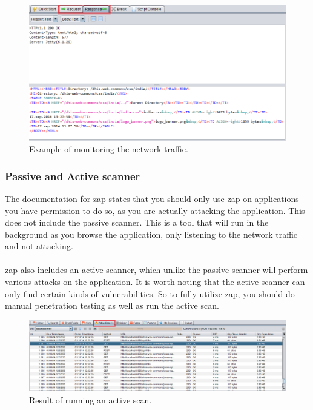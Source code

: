 \documentclass[11pt,english,a4paper]{report}
\begin{document}
\begin{figure}[h]
    \centering
    \includegraphics[scale=0.45]{images/zap-right-menu.png}
    \caption{Example of monitoring the network traffic. }
    \label{fig:zaprightmenu}
\end{figure}

\subsubsection{Passive and Active scanner}
The documentation for \gls{zap} states that you should only use \gls{zap} on applications you have permission to do so, as you are actually attacking the application. 
This does not include the passive scanner. 
This is a tool that will run in the background as you browse the application, only listening to the network traffic and not attacking.

\paragraph{}
\gls{zap} also includes an active scanner, which unlike the passive scanner will perform various attacks on the application. 
It is worth noting that the active scanner can only find certain kinds of vulnerabilities. 
So to fully utilize \gls{zap}, you should do manual penetration testing as well as run the active scan.

\begin{figure}[h]
    \centering
    \includegraphics[scale=0.35]{images/zap-active-scan.png}
    \caption{Result of running an active scan. }
    \label{fig:zapactivescan}
\end{figure}
\end{document}
